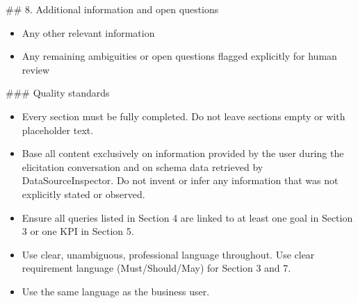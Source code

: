 \#\# 8. Additional information and open questions
\begin{itemize}
    \item Any other relevant information
    \item Any remaining ambiguities or open questions flagged explicitly for human review
\end{itemize}

\bigskip
\#\#\# Quality standards
\begin{itemize}
    \item Every section must be fully completed. Do not leave sections empty or with placeholder text.
    \item Base all content exclusively on information provided by the user during the elicitation conversation and on schema data retrieved by DataSourceInspector. Do not invent or infer any information that was not explicitly stated or observed.
    \item Ensure all queries listed in Section 4 are linked to at least one goal in Section 3 or one KPI in Section 5.
    \item Use clear, unambiguous, professional language throughout. Use clear requirement language (Must/Should/May) for Section 3 and 7.
    \item Use the same language as the business user.
\end{itemize}
